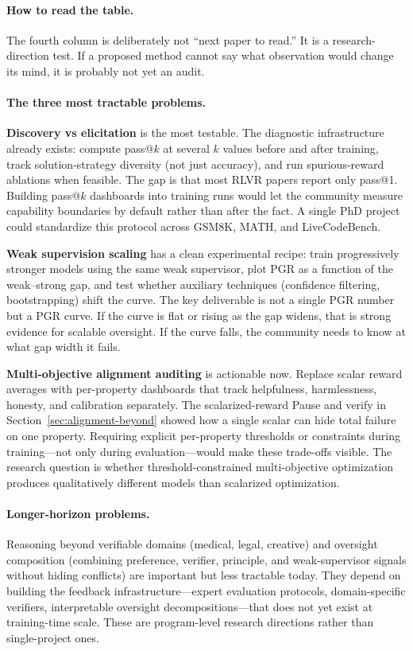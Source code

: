 \paragraph{How to read the table.} The fourth column is deliberately not ``next paper to read.'' It is a research-direction test. If a proposed method cannot say what observation would change its mind, it is probably not yet an audit.

\paragraph{The three most tractable problems.}

\textbf{Discovery vs elicitation} is the most testable. The diagnostic infrastructure already exists: compute pass@$k$ at several $k$ values before and after training, track solution-strategy diversity (not just accuracy), and run spurious-reward ablations when feasible. The gap is that most RLVR papers report only pass@1. Building pass@$k$ dashboards into training runs would let the community measure capability boundaries by default rather than after the fact. A single PhD project could standardize this protocol across GSM8K, MATH, and LiveCodeBench.

\textbf{Weak supervision scaling} has a clean experimental recipe: train progressively stronger models using the same weak supervisor, plot PGR as a function of the weak--strong gap, and test whether auxiliary techniques (confidence filtering, bootstrapping) shift the curve. The key deliverable is not a single PGR number but a PGR curve. If the curve is flat or rising as the gap widens, that is strong evidence for scalable oversight. If the curve falls, the community needs to know at what gap width it fails.

\textbf{Multi-objective alignment auditing} is actionable now. Replace scalar reward averages with per-property dashboards that track helpfulness, harmlessness, honesty, and calibration separately. The scalarized-reward Pause and verify in Section~\ref{sec:alignment-beyond} showed how a single scalar can hide total failure on one property. Requiring explicit per-property thresholds or constraints during training---not only during evaluation---would make these trade-offs visible. The research question is whether threshold-constrained multi-objective optimization produces qualitatively different models than scalarized optimization.

\paragraph{Longer-horizon problems.} Reasoning beyond verifiable domains (medical, legal, creative) and oversight composition (combining preference, verifier, principle, and weak-supervisor signals without hiding conflicts) are important but less tractable today. They depend on building the feedback infrastructure---expert evaluation protocols, domain-specific verifiers, interpretable oversight decompositions---that does not yet exist at training-time scale. These are program-level research directions rather than single-project ones.


